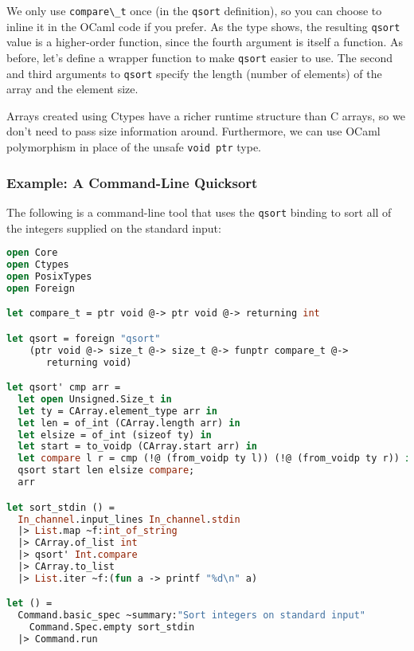 We only use \passthrough{\lstinline!compare\_t!} once (in the
\passthrough{\lstinline!qsort!} definition), so you can choose to inline
it in the OCaml code if you prefer. As the type shows, the resulting
\passthrough{\lstinline!qsort!} value is a higher-order function, since
the fourth argument is itself a function. As before, let's define a
wrapper function to make \passthrough{\lstinline!qsort!} easier to use.
The second and third arguments to \passthrough{\lstinline!qsort!}
specify the length (number of elements) of the array and the element
size.

Arrays created using Ctypes have a richer runtime structure than C
arrays, so we don't need to pass size information around. Furthermore,
we can use OCaml polymorphism in place of the unsafe
\passthrough{\lstinline!void ptr!} type.

\hypertarget{example-a-command-line-quicksort}{%
\subsubsection{Example: A Command-Line
Quicksort}\label{example-a-command-line-quicksort}}

The following is a command-line tool that uses the
\passthrough{\lstinline!qsort!} binding to sort all of the integers
supplied on the standard input: 

\begin{lstlisting}[language=Caml]
open Core
open Ctypes
open PosixTypes
open Foreign

let compare_t = ptr void @-> ptr void @-> returning int

let qsort = foreign "qsort"
    (ptr void @-> size_t @-> size_t @-> funptr compare_t @->
       returning void)

let qsort' cmp arr =
  let open Unsigned.Size_t in
  let ty = CArray.element_type arr in
  let len = of_int (CArray.length arr) in
  let elsize = of_int (sizeof ty) in
  let start = to_voidp (CArray.start arr) in
  let compare l r = cmp (!@ (from_voidp ty l)) (!@ (from_voidp ty r)) in
  qsort start len elsize compare;
  arr

let sort_stdin () =
  In_channel.input_lines In_channel.stdin
  |> List.map ~f:int_of_string
  |> CArray.of_list int
  |> qsort' Int.compare
  |> CArray.to_list
  |> List.iter ~f:(fun a -> printf "%d\n" a)

let () =
  Command.basic_spec ~summary:"Sort integers on standard input"
    Command.Spec.empty sort_stdin
  |> Command.run
\end{lstlisting}

